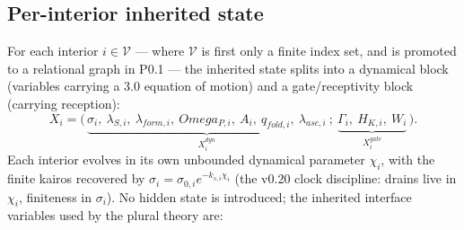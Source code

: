 \documentclass[11pt,a4paper]{article}
\def\Omega{Omega}%
\def\mathrm#1{#1}%
\theoremstyle{definition}
\theoremstyle{plain}
\theoremstyle{remark}
\begin{document}
\subsection{Per-interior inherited state}

For each interior $i\in\mathcal V$ --- where $\mathcal V$ is first only a finite
index set, and is promoted to a relational graph in P0.1 --- the inherited state
splits into a dynamical block
(variables carrying a 3.0 equation of motion) and a gate/receptivity block (carrying
reception):
\[
X_i=\bigl(\,\underbrace{\sigma_i,\ \lambda_{S,i},\ \lambda_{\mathrm{form},i},\ \Omega_{P,i},\ A_i,\ q_{\mathrm{fold},i},\ \lambda_{\mathrm{asc},i}}_{X_i^{\mathrm{dyn}}}\ ;\ \underbrace{\Gamma_i,\ H_{K,i},\ W_i}_{X_i^{\mathrm{gate}}}\,\bigr).
\]
Each interior evolves in its own unbounded dynamical parameter $\chi_i$, with the
finite kairos recovered by $\sigma_i=\sigma_{0,i}e^{-k_{s,i}\chi_i}$ (the v0.20
clock discipline: drains live in $\chi_i$, finiteness in $\sigma_i$). No hidden
state is introduced; the inherited interface variables used by the plural theory are:
\end{document}
